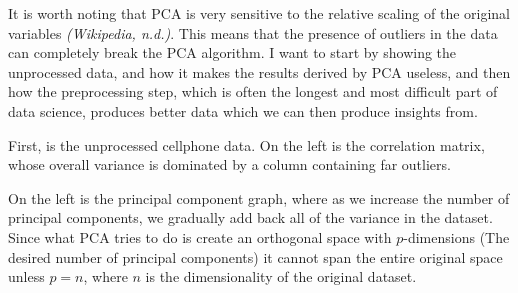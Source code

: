 \documentclass[20pt]{article} %
\begin{document}
It is worth noting that PCA is very sensitive to the relative scaling of the original variables \textit{(Wikipedia, n.d.)}.  This means that the presence of outliers in the data can completely break the PCA algorithm.  I want to start by showing the unprocessed data, and how it makes the results derived by PCA useless, and then how the preprocessing step, which is often the longest and most difficult part of data science, produces better data which we can then produce insights from.

First, is the unprocessed cellphone data.  On the left is the correlation matrix, whose overall variance is dominated by a column containing far outliers. 

On the left is the principal component graph, where as we increase the number of principal components, we gradually add back all of the variance in the dataset. Since what PCA tries to do is create an orthogonal space with $p$-dimensions (The desired number of principal components) it cannot span the entire original space unless $p = n$, where $n$ is the dimensionality of the original dataset.
\end{document}
